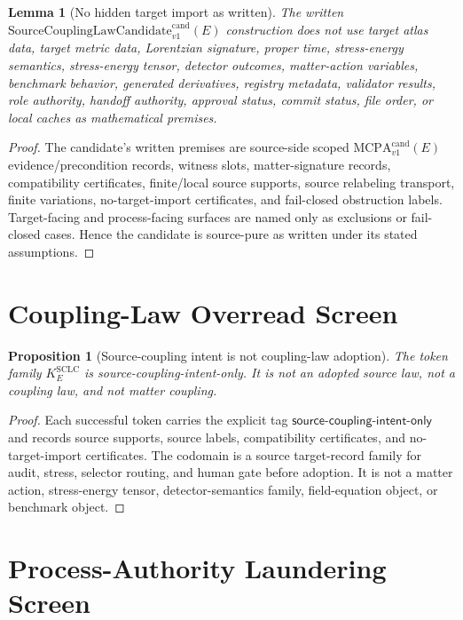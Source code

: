 \documentclass[11pt]{article}
\newcommand{\MCPA}{\mathrm{MCPA}^{\mathrm{cand}}_{v1}}
\newcommand{\SourceCoupCand}{\mathrm{SourceCouplingLawCandidate}^{\mathrm{cand}}_{v1}}
\newtheorem{lemma}{Lemma}
\newtheorem{proposition}{Proposition}
\begin{document}
\begin{lemma}[No hidden target import as written]
The written \(\SourceCoupCand(E)\) construction does not use target atlas
data, target metric data, Lorentzian signature, proper time, stress-energy
semantics, stress-energy tensor, detector outcomes, matter-action variables,
benchmark behavior, generated derivatives, registry metadata, validator
results, role authority, handoff authority, approval status, commit status,
file order, or local caches as mathematical premises.
\end{lemma}

\begin{proof}
The candidate's written premises are source-side scoped \(\MCPA(E)\)
evidence/precondition records, witness slots, matter-signature records,
compatibility certificates, finite/local source supports, source relabeling
transport, finite variations, no-target-import certificates, and fail-closed
obstruction labels. Target-facing and process-facing surfaces are named only
as exclusions or fail-closed cases. Hence the candidate is source-pure as
written under its stated assumptions.
\end{proof}

\section{Coupling-Law Overread Screen}

\begin{proposition}[Source-coupling intent is not coupling-law adoption]
The token family \(K_E^{\mathrm{SCLC}}\) is source-coupling-intent-only. It is
not an adopted source law, not a coupling law, and not matter coupling.
\end{proposition}

\begin{proof}
Each successful token carries the explicit tag
\(\mathsf{source\text{-}coupling\text{-}intent\text{-}only}\) and records
source supports, source labels, compatibility certificates, and
no-target-import certificates. The codomain is a source target-record family
for audit, stress, selector routing, and human gate before adoption. It is
not a matter action, stress-energy tensor, detector-semantics family,
field-equation object, or benchmark object.
\end{proof}

\section{Process-Authority Laundering Screen}
\end{document}
